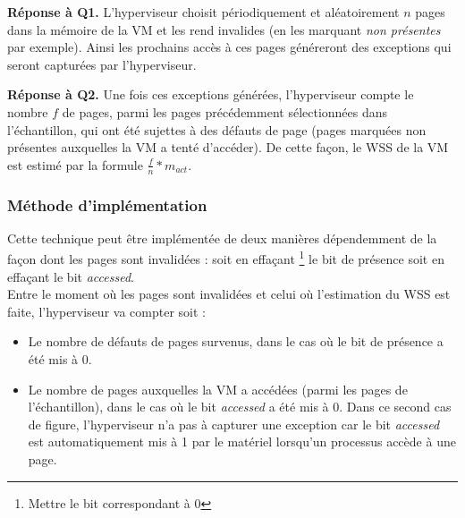 \par{\textbf{Réponse à Q1.}} L'hyperviseur choisit périodiquement et aléatoirement $n$ pages dans la mémoire de la VM et les rend invalides (en les marquant \textit{non présentes} par exemple). Ainsi les prochains accès à ces pages généreront des exceptions qui seront capturées par l'hyperviseur.

\par{\textbf{Réponse à Q2.}} Une fois ces exceptions générées, l'hyperviseur compte le nombre $f$ de pages, parmi les pages précédemment sélectionnées dans l'échantillon, qui ont été sujettes à des défauts de page (pages marquées non présentes auxquelles la VM a tenté d'accéder). De cette façon, le WSS de la VM est estimé par la formule $ \frac{f}{n}* \textit{m}_\textit{act} $.

\subsubsection{Méthode d'implémentation}
Cette technique peut être implémentée de deux manières dépendemment de la façon dont les pages sont invalidées : soit en effaçant \footnote{Mettre le bit correspondant à 0} le bit de présence soit en effaçant le bit \textit{accessed}.\\
Entre le moment où les pages sont invalidées et celui où l'estimation du WSS est faite, l'hyperviseur va compter soit :
\begin{itemize}
    \item Le nombre de défauts de pages survenus, dans le cas où le bit de présence a été mis à 0.
    \item Le nombre de pages auxquelles la VM a accédées (parmi les pages de l'échantillon), dans le cas où le bit \textit{accessed} a été mis à 0. Dans ce second cas de figure, l'hyperviseur n'a pas à capturer une exception car le bit \textit{accessed} est automatiquement mis à 1 par le matériel lorsqu'un processus accède à une page.
\end{itemize}

